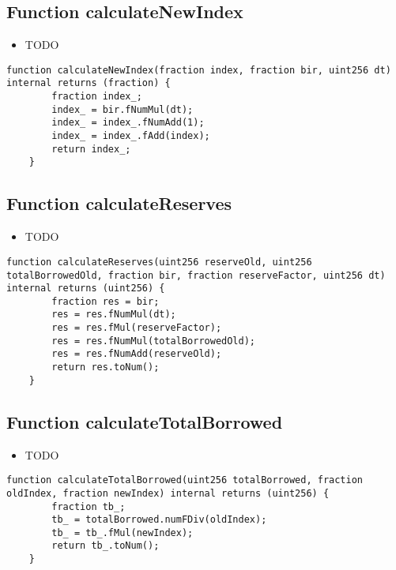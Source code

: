 \subsection{Function calculateNewIndex}

\noindent\begin{itemize}
\item TODO
\end{itemize}

\begin{lstlisting}[firstnumber=37]
    function calculateNewIndex(fraction index, fraction bir, uint256 dt) internal returns (fraction) {
        fraction index_;
        index_ = bir.fNumMul(dt);
        index_ = index_.fNumAdd(1);
        index_ = index_.fAdd(index);
        return index_;
    }
\end{lstlisting}

\subsection{Function calculateReserves}

\noindent\begin{itemize}
\item TODO
\end{itemize}

\begin{lstlisting}[firstnumber=52]
    function calculateReserves(uint256 reserveOld, uint256 totalBorrowedOld, fraction bir, fraction reserveFactor, uint256 dt) internal returns (uint256) {
        fraction res = bir;
        res = res.fNumMul(dt);
        res = res.fMul(reserveFactor);
        res = res.fNumMul(totalBorrowedOld);
        res = res.fNumAdd(reserveOld);
        return res.toNum();
    }
\end{lstlisting}

\subsection{Function calculateTotalBorrowed}

\noindent\begin{itemize}
\item TODO
\end{itemize}

\begin{lstlisting}[firstnumber=45]
    function calculateTotalBorrowed(uint256 totalBorrowed, fraction oldIndex, fraction newIndex) internal returns (uint256) {
        fraction tb_;
        tb_ = totalBorrowed.numFDiv(oldIndex);
        tb_ = tb_.fMul(newIndex);
        return tb_.toNum();
    }
\end{lstlisting}

